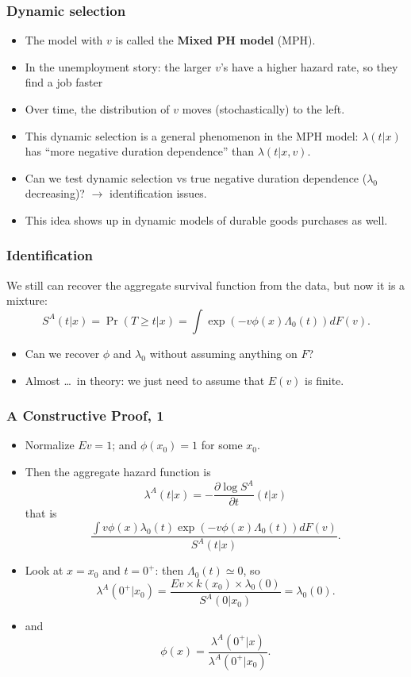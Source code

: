 \documentclass[xcolor=pdftex,dvipsnames,table,mathserif]{beamer}
\begin{document}
 \begin{frame}
 \frametitle{Dynamic selection}
\begin{itemize}
\item The model with $v$ is called the \textbf{Mixed PH model} (MPH).
\item In the unemployment story: the larger $v$'s have a higher hazard
  rate, so they find a job faster
\item Over time, the distribution of $v$ moves (stochastically) to the
  left.
\item This \alert{dynamic selection} is a general phenomenon in the MPH
  model: $\lambda(t \vert x)$ has ``more negative duration dependence'' than
  $\lambda(t \vert x,v)$.
\item Can we test dynamic selection vs true negative duration dependence
  ($\lambda_0$ decreasing)? $\rightarrow$ identification issues.
  \item This idea shows up in dynamic models of durable goods purchases as well.
  \end{itemize}
\end{frame}



\begin{frame}
\frametitle{Identification}
We still can recover the aggregate survival function from the data, but now it
is a mixture:
\[
S^A(t \vert x)=\Pr(T \geq t \vert x)=
\int \exp(-v \phi(x)\Lambda_0(t))dF(v).
\]
\begin{itemize}
\item Can we recover $\phi$ and $\lambda_0$ without assuming anything on $F$?
\item Almost \ldots\ in theory: we just need to assume that $E(v)$ is finite.
\end{itemize}
\end{frame}



\begin{frame}
\frametitle{A Constructive Proof, 1}
\begin{itemize}
\item Normalize $Ev=1$; and $\phi(x_0)=1$ for some $x_0$. 
\item Then the aggregate hazard function is
\[
\lambda^A(t \vert x)=-\frac{\partial \log S^A}{\partial t}(t \vert x)
\]
that is
\[
\frac{\int v \phi(x)\lambda_0(t)\exp(-v \phi(x)\Lambda_0(t))dF(v)}{S^A(t \vert x)}.
\]
\item
Look at $x=x_0$ and $t=0^+$: then $\Lambda_0(t) \simeq 0$, so
\[
\lambda^A(0^+\vert x_0)=\frac{Ev \times k(x_0) \times \lambda_0(0)}{S^A(0\vert x_0)}=\lambda_0(0).
\]
\item
and
\[
\phi(x)=\frac{\lambda^A(0^+ \vert x)}{\lambda^A(0^+ \vert x_0)}.
\]
\end{itemize}
\end{frame}
\end{document}
